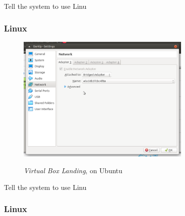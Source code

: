 Tell the system to use Linu
\subsubsection{Linux}

\begin{figure}[!htb]
    \centering
    \includegraphics[width=0.752\textwidth]{images/00-10.png}\\[0cm]  
    \caption[Virtual Box]{\emph{Virtual Box Landing}, on Ubuntu}
    \label{fig:00-10 - Linux Virtual Box Landing} 
\end{figure}

Tell the system to use Linu
\subsubsection{Linux}

